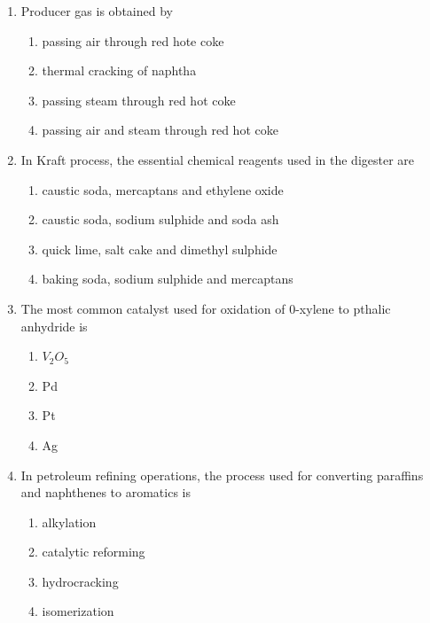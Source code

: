 \documentclass[journal,12pt,onecolumn]{IEEEtran}
\theoremstyle{remark}
\begin{document}
\begin{enumerate}
    \item Producer gas is obtained by
    
 \hfill{}
 
\begin{enumerate}
    \item passing air through red hote coke
    \item thermal cracking of naphtha
    \item passing steam through red hot coke
    \item passing air and steam through red hot coke
\end{enumerate}
    \item In Kraft process, the essential chemical reagents used in the digester are    
    
 \hfill{}
 
\begin{enumerate}
    \item caustic soda, mercaptans and ethylene oxide
    \item caustic soda, sodium sulphide and soda ash
    \item quick lime, salt cake and dimethyl sulphide
    \item baking soda, sodium sulphide and mercaptans
\end{enumerate}

    \item
        The most common catalyst used for oxidation of 0-xylene to pthalic anhydride is
        
  \hfill{}
\begin{enumerate}
    \item $V_2 O_5$
    \item Pd
    \item Pt
    \item Ag
\end{enumerate}

    \item In petroleum refining operations, the process used for converting paraffins and naphthenes to aromatics is
    
 \hfill{}
 
\begin{enumerate}
    \item alkylation
    \item catalytic reforming
    \item hydrocracking
    \item isomerization
\end{enumerate}



\end{enumerate}
\end{document}
